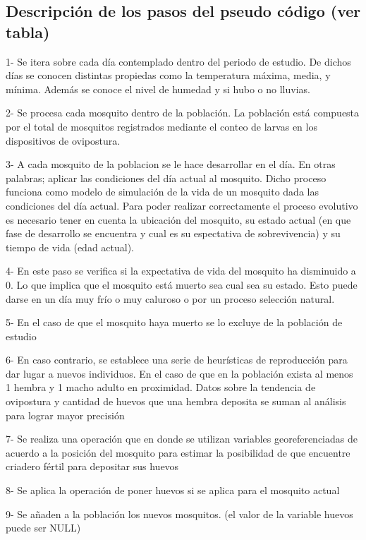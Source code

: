 \subsection{Descripción de los pasos del pseudo código (ver tabla)}

1- Se itera sobre cada día contemplado dentro del periodo de estudio.
De dichos días se conocen distintas propiedas como la temperatura máxima,
media, y mínima. Además se conoce el nivel de humedad y si hubo o no
lluvias.

2- Se procesa cada mosquito dentro de la población. La población está
compuesta por el total de mosquitos registrados mediante el conteo de larvas
en los dispositivos de ovipostura.

3- A cada mosquito de la poblacion se le hace desarrollar en el día.
En otras palabras; aplicar las condiciones del día actual al mosquito. Dicho
proceso funciona como modelo de simulación de la vida de un mosquito
dada las condiciones del día actual. Para poder realizar
correctamente el proceso evolutivo es necesario tener en cuenta la
ubicación del mosquito, su estado actual (en que fase de desarrollo se
encuentra y cual es su espectativa de sobrevivencia) y su tiempo de vida
(edad actual).

4- En este paso se verifica si la expectativa de vida del mosquito ha
disminuido a 0. Lo que implica que el mosquito está muerto sea cual sea
su estado. Esto puede darse en un día muy frío o muy caluroso o por un proceso
selección natural.

5- En el caso de que el mosquito haya muerto se lo excluye de la
población de estudio

6- En caso contrario, se establece una serie de heurísticas de reproducción
para dar lugar a nuevos individuos. En el caso de que en la población exista
al menos 1 hembra y 1 macho adulto en proximidad. Datos sobre la tendencia
de ovipostura y cantidad de huevos que una hembra deposita se suman al
análisis para lograr mayor precisión

7- Se realiza una operación que en donde se utilizan variables
georeferenciadas de acuerdo a la posición del mosquito para estimar
la posibilidad de que encuentre criadero fértil para depositar sus huevos

8- Se aplica la operación de poner huevos si se aplica para el mosquito actual

9- Se añaden a la población los nuevos mosquitos. (el valor de la variable
huevos puede ser NULL)



